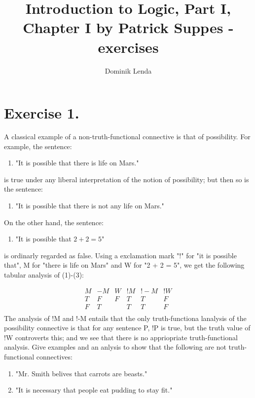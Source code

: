 \documentclass{article}
\title{Introduction to Logic, Part I, Chapter I by Patrick Suppes - exercises}
\author{Dominik Lenda}
\begin{document}
\maketitle

\section*{Exercise 1.}
A classical example of a non-truth-functional connective is that of possibility. For example, the sentence:

\begin{enumerate}
\item "It is possible that there is life on Mars."
\end{enumerate}
is true under any liberal interpretation of the notion of possibility; but then so is the sentence:
\begin{enumerate}[resume]
\item "It is possible that there is not any life on Mars."
\end{enumerate}
On the other hand, the sentence:
\begin{enumerate}[resume]
\item "It is possible that \(2 + 2 = 5\)"
\end{enumerate}
is ordinarly regarded as false. Using a exclamation mark "!" for "it is possible that", M for "there is life on Mars" and W for "2 + 2 = 5", we get the following tabular analysis of (1)-(3):

\[
\begin{array}{c|c|c|c|c|c}
M & -M & W & !M & !-M & !W\\
\hline
T & F & F & T & T & F\\
F & T &  & T & T & F\\
\end{array}
\]
\singlespace
The analysis of !M and !-M entails that the only truth-functiona lanalysis of the possibility connective is that for any sentence P, !P is true, but the truth value of !W controverts this; and we see that there is no appriopriate truth-functional analysis.
\singlespace
Give examples and an anlysis to show that the following are not truth-functional connectives:
\begin{enumerate}[label=(\alph*)]
    \item "Mr. Smith belives that carrots are beasts."
    \item "It is necessary that people eat pudding to stay fit."
\singlespace
\end{enumerate}
\end{document}

